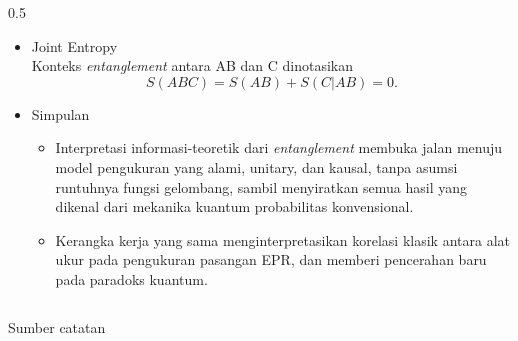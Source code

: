 \begin{frame}
\begin{columns}[T]
        \begin{column}{0.5\textwidth}
            \begin{itemize}\tiny\justifying
                \item[$\Rightarrow$] Joint Entropy \\
                    Konteks \textit{entanglement} antara AB dan C dinotasikan
                    \begin{equation}
                        S(ABC)=S(AB)+S(C|AB)=0.
                        \label{eq:joint-entropy-abc}
                    \end{equation}
                \item Simpulan
                    \begin{itemize}\tiny\justifying
                        \item[$\Rightarrow$] Interpretasi informasi-teoretik dari
                            \textit{entanglement} membuka jalan menuju model
                            pengukuran yang alami, unitary, dan kausal, tanpa
                            asumsi runtuhnya fungsi gelombang, sambil menyiratkan
                            semua hasil yang dikenal dari mekanika kuantum
                            probabilitas konvensional.
                        \item[$\Rightarrow$] Kerangka kerja yang sama menginterpretasikan
                            korelasi klasik antara alat ukur pada pengukuran pasangan
                            EPR, dan memberi pencerahan baru pada paradoks kuantum.
                    \end{itemize}
            \end{itemize}
        \end{column}
    \end{columns}
    {\tiny\vspace{-0.1cm} Sumber catatan }
\end{frame}
